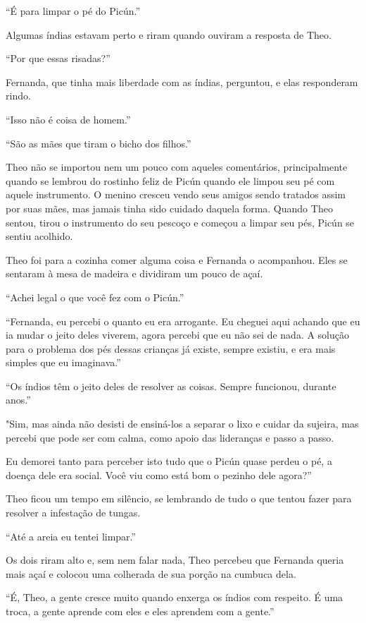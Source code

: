 ``É para limpar o pé do Picún.''

Algumas índias estavam perto e riram quando ouviram a resposta de Theo.

``Por que essas risadas?''

Fernanda, que tinha mais liberdade com as índias, perguntou, e elas
responderam rindo.

``Isso não é coisa de homem.''

``São as mães que tiram o bicho dos filhos.''

Theo não se importou nem um pouco com
aqueles comentários, principalmente quando se lembrou do rostinho feliz
de Picún quando ele limpou seu pé com aquele instrumento. O menino
cresceu vendo seus amigos sendo tratados assim por suas mães, mas jamais
tinha sido cuidado daquela forma. Quando Theo sentou, tirou o
instrumento do seu pescoço e começou a limpar seu pés, Picún se sentiu
acolhido.

Theo foi para a cozinha comer alguma coisa e Fernanda o acompanhou. Eles
se sentaram à mesa de madeira e dividiram um pouco de açaí.

``Achei legal o que você fez com o Picún.''

``Fernanda, eu percebi o quanto eu era arrogante. Eu cheguei aqui
achando que eu ia mudar o jeito deles viverem, agora percebi que eu não
sei de nada. A solução para o problema dos pés dessas crianças já
existe, sempre existiu, e era mais simples que eu imaginava.''

``Os índios têm o jeito deles de resolver as coisas. Sempre funcionou,
durante anos.''

"Sim, mas ainda não desisti de ensiná-los a separar o lixo e cuidar da
sujeira, mas percebi que pode ser com calma, como apoio das lideranças e
passo a passo.

Eu demorei tanto para perceber isto tudo que o Picún quase perdeu o pé,
a doença dele era social. Você viu como está bom o pezinho dele agora?''

Theo ficou um tempo em silêncio, se lembrando de tudo o que tentou fazer
para resolver a infestação de tungas.

``Até a areia eu tentei limpar.''

Os dois riram alto e, sem nem falar nada, Theo percebeu que Fernanda
queria mais açaí e colocou uma colherada de sua porção na cumbuca dela.

``É, Theo, a gente cresce muito quando enxerga os índios com respeito. É
uma troca, a gente aprende com eles e eles aprendem com a gente.''

